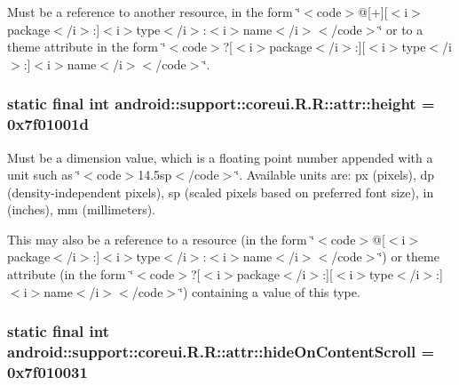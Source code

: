 Must be a reference to another resource, in the form \char`\"{}$<$code$>$@\mbox{[}+\mbox{]}\mbox{[}$<$i$>$package$<$/i$>$:\mbox{]}$<$i$>$type$<$/i$>$:$<$i$>$name$<$/i$>$$<$/code$>$\char`\"{} or to a theme attribute in the form \char`\"{}$<$code$>$?\mbox{[}$<$i$>$package$<$/i$>$:\mbox{]}\mbox{[}$<$i$>$type$<$/i$>$:\mbox{]}$<$i$>$name$<$/i$>$$<$/code$>$\char`\"{}. \hypertarget{classandroid_1_1support_1_1coreui_1_1_r_1_1attr_4bfbbf07a7efa6af210f12dd60cc188f}{
\subsubsection[{height}]{\setlength{\rightskip}{0pt plus 5cm}static final int android::support::coreui.R.R::attr::height = 0x7f01001d}}
\label{classandroid_1_1support_1_1coreui_1_1_r_1_1attr_4bfbbf07a7efa6af210f12dd60cc188f}


Must be a dimension value, which is a floating point number appended with a unit such as \char`\"{}$<$code$>$14.5sp$<$/code$>$\char`\"{}. Available units are: px (pixels), dp (density-independent pixels), sp (scaled pixels based on preferred font size), in (inches), mm (millimeters). 

This may also be a reference to a resource (in the form \char`\"{}$<$code$>$@\mbox{[}$<$i$>$package$<$/i$>$:\mbox{]}$<$i$>$type$<$/i$>$:$<$i$>$name$<$/i$>$$<$/code$>$\char`\"{}) or theme attribute (in the form \char`\"{}$<$code$>$?\mbox{[}$<$i$>$package$<$/i$>$:\mbox{]}\mbox{[}$<$i$>$type$<$/i$>$:\mbox{]}$<$i$>$name$<$/i$>$$<$/code$>$\char`\"{}) containing a value of this type. \hypertarget{classandroid_1_1support_1_1coreui_1_1_r_1_1attr_5cf18cd31c5f153585239c7d66c6f7c8}{
\subsubsection[{hideOnContentScroll}]{\setlength{\rightskip}{0pt plus 5cm}static final int android::support::coreui.R.R::attr::hideOnContentScroll = 0x7f010031}}
\label{classandroid_1_1support_1_1coreui_1_1_r_1_1attr_5cf18cd31c5f153585239c7d66c6f7c8}


